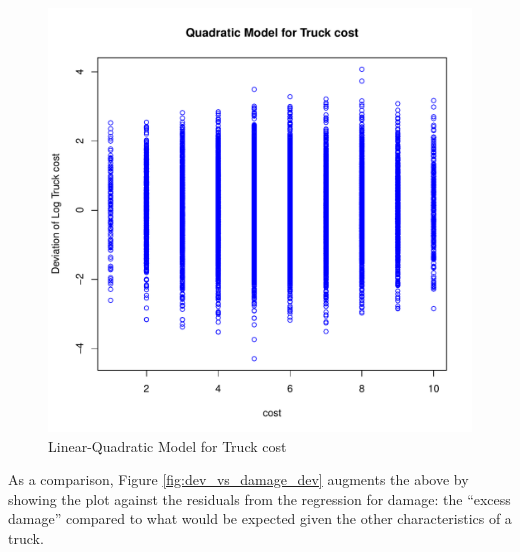 \documentclass[11pt]{paper}
\begin{document}
\begin{figure}[h!]
  \centering
  \includegraphics[scale = 0.5, keepaspectratio=true]{../Figures/dev_vs_cost}
  \caption{Linear-Quadratic Model for Truck cost} \label{fig:dev_vs_cost}
\end{figure}



\pagebreak
As a comparison, Figure \ref{fig:dev_vs_damage_dev} 
augments the above by showing the plot against the 
residuals from the regression for damage:
the ``excess damage'' compared to what would be 
expected given the other characteristics of a truck. 
\end{document}
